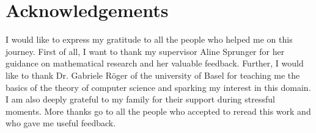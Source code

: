 \chapter*{Acknowledgements}

I would like to express my gratitude to all the people who helped me on this journey.
First of all, I want to thank my supervisor Aline Sprunger for her guidance on mathematical research and her valuable feedback.
Further, I would like to thank Dr. Gabriele Röger of the university of Basel for teaching me the basics of the theory of computer science and sparking my interest in this domain.
I am also deeply grateful to my family for their support during stressful moments.
More thanks go to all the people who accepted to reread this work and who gave me useful feedback.
